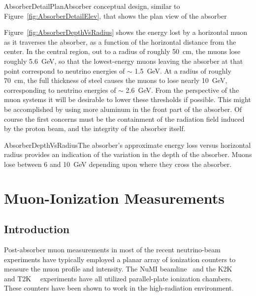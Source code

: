 \begin{cdrfigure}{AbsorberDetailPlan}{Absorber conceptual design, 
similar to Figure~\ref{fig:AbsorberDetailElev}, that 
shows the plan view of the absorber}

\end{cdrfigure}

Figure~\ref{fig:AbsorberDepthVsRadius} shows the energy lost by a
horizontal muon as it traverses the absorber, as a function of the
horizontal distance from the center. In the central region, out to a
radius of roughly 50~cm, the muons lose roughly 5.6~GeV, so that the
lowest-energy muons leaving the absorber at that point correspond to
neutrino energies of $\sim$ 1.5~GeV. At a radius of roughly 70~cm, the
full thickness of steel causes the muons to lose nearly 10~GeV,
corresponding to neutrino energies of $\sim$ 2.6~GeV. From the
perspective of the muon systems it will be desirable to lower these
thresholds if possible. This might be accomplished by using more
aluminum in the front part of the absorber. Of course the first
concerns must be the containment of the radiation field induced by the
proton beam, and the integrity of the absorber itself. 

\begin{cdrfigure}{AbsorberDepthVsRadius}{The absorber's approximate
energy loss versus horizontal radius provides an indication of the variation in 
the depth of the absorber. Muons lose between 6 and 10~GeV depending upon where they cross the absorber.}
\end{cdrfigure}

\section{Muon-Ionization Measurements}
\label{sec:nd-blm-muon-ionization}

\subsection{Introduction}

Post-absorber muon measurements in most of the recent neutrino-beam
experiments have typically employed a planar array of ionization
counters to measure the muon profile and intensity. The 
NuMI beamline~\cite{ref:NuMIBeamMonitors} and the K2K~\cite{ref:K2K}~\cite{ref:Maruyama}
and T2K~\cite{ref:T2KMuIon}~\cite{ref:T2KMuMon} experiments have all
utilized parallel-plate ionization chambers. These counters have been
shown to work in the high-radiation environment. 

